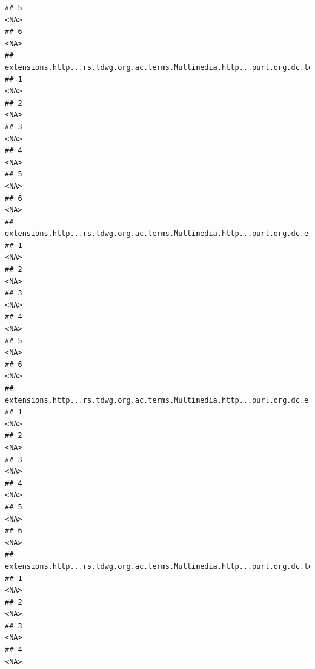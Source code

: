 \documentclass[
]{book}
\begin{document}
\begin{verbatim}
## 5                                                                                         <NA>
## 6                                                                                         <NA>
##   extensions.http...rs.tdwg.org.ac.terms.Multimedia.http...purl.org.dc.terms.rights.3
## 1                                                                                <NA>
## 2                                                                                <NA>
## 3                                                                                <NA>
## 4                                                                                <NA>
## 5                                                                                <NA>
## 6                                                                                <NA>
##   extensions.http...rs.tdwg.org.ac.terms.Multimedia.http...purl.org.dc.elements.1.1.type.3
## 1                                                                                     <NA>
## 2                                                                                     <NA>
## 3                                                                                     <NA>
## 4                                                                                     <NA>
## 5                                                                                     <NA>
## 6                                                                                     <NA>
##   extensions.http...rs.tdwg.org.ac.terms.Multimedia.http...purl.org.dc.elements.1.1.creator.3
## 1                                                                                        <NA>
## 2                                                                                        <NA>
## 3                                                                                        <NA>
## 4                                                                                        <NA>
## 5                                                                                        <NA>
## 6                                                                                        <NA>
##   extensions.http...rs.tdwg.org.ac.terms.Multimedia.http...purl.org.dc.terms.format.3
## 1                                                                                <NA>
## 2                                                                                <NA>
## 3                                                                                <NA>
## 4                                                                                <NA>

\end{verbatim}
\end{document}

